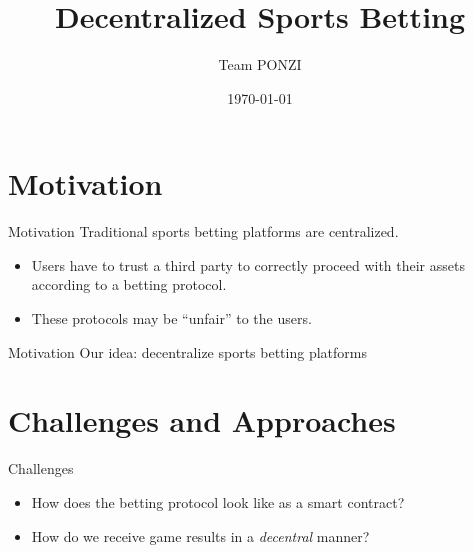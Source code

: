 \documentclass[aspectratio=169]{beamer}
\title{Decentralized Sports Betting}
\date{\today}
\author{Team PONZI}
\institute{Blockchain Technologies}
\begin{document}
  \maketitle
  \section{Motivation}
  \begin{frame}{Motivation}
    Traditional sports betting platforms are centralized.
    \begin{itemize}
      \item Users have to trust a third party to correctly proceed with their assets according to a betting protocol.
      \item These protocols may be ``unfair'' to the users.
    \end{itemize}
  \end{frame}

  \begin{frame}{Motivation}
    Our idea: decentralize sports betting platforms
  \end{frame}

  \section{Challenges and Approaches}
  \begin{frame}{Challenges}
    \begin{itemize}
      \item How does the betting protocol look like as a smart contract?
      \item How do we receive game results in a \emph{decentral} manner?
    \end{itemize}
  \end{frame}

\end{document}
